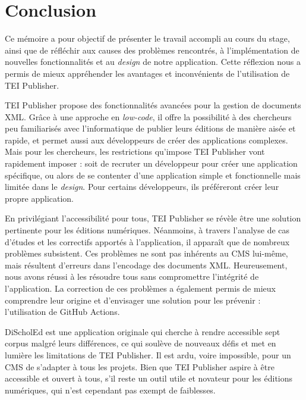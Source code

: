 \chapter*{Conclusion}

Ce mémoire a pour objectif de présenter le travail accompli au cours du stage, ainsi que de réfléchir aux causes des problèmes rencontrés, à l'implémentation de nouvelles fonctionnalités et au \textit{design} de notre application. Cette réflexion nous a permis de mieux appréhender les avantages et inconvénients de l'utilisation de TEI Publisher.

TEI Publisher propose des fonctionnalités avancées pour la gestion de documents XML. Grâce à une approche en \textit{low-code}, il offre la possibilité à des chercheurs peu familiarisés avec l'informatique de publier leurs éditions de manière aisée et rapide, et permet aussi aux développeurs de créer des applications complexes. Mais pour les chercheurs, les restrictions qu'impose TEI Publisher vont rapidement imposer : soit de recruter un développeur pour créer une application spécifique, ou alors de se contenter d'une application simple et fonctionnelle mais limitée dans le \textit{design}. Pour certains développeurs, ils préféreront créer leur propre application.

En privilégiant l'accessibilité pour tous, TEI Publisher se révèle être une solution pertinente pour les éditions numériques. Néanmoins, à travers l'analyse de cas d'études et les correctifs apportés à l'application, il apparaît que de nombreux problèmes subsistent. Ces problèmes ne sont pas inhérents au CMS lui-même, mais résultent d'erreurs dans l'encodage des documents XML. Heureusement, nous avons réussi à les résoudre tous sans compromettre l'intégrité de l'application. La correction de ces problèmes a également permis de mieux comprendre leur origine et d'envisager une solution pour les prévenir : l'utilisation de GitHub Actions.

DiScholEd est une application originale qui cherche à rendre accessible sept corpus malgré leurs différences, ce qui soulève de nouveaux défis et met en lumière les limitations de TEI Publisher. Il est ardu, voire impossible, pour un CMS de s'adapter à tous les projets. Bien que TEI Publisher aspire à être accessible et ouvert à tous, s'il reste un outil utile et novateur pour les éditions numériques, qui n’est cependant pas exempt de faiblesses.